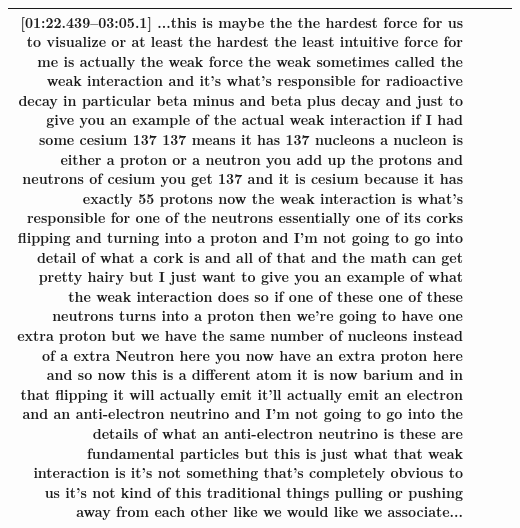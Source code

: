 \documentclass[10pt]{article}
\begin{document}
\begin{tiny}
\begin{longtable}{|r|p{0.375in}|p{1.275in}|p{3.5in}|}
                                                                                                                                                                                                                                                                                               \textbf{[01:22.439--03:05.1]} ...this is maybe the the hardest force for us to visualize or at least the hardest the least intuitive force for me is actually the weak force the weak sometimes called the weak interaction and it's what's responsible for radioactive decay in particular beta minus and beta plus decay and just to give you an example of the actual weak interaction if I had some cesium 137 137 means it has 137 nucleons a nucleon is either a proton or a neutron you add up the protons and neutrons of cesium you get 137 and it is cesium because it has exactly 55 protons now the weak interaction is what's responsible for one of the neutrons essentially one of its corks flipping and turning into a proton and I'm not going to go into detail of what a cork is and all of that and the math can get pretty hairy but I just want to give you an example of what the weak interaction does so if one of these one of these neutrons turns into a proton then we're going to have one extra proton but we have the same number of nucleons instead of a extra Neutron here you now have an extra proton here and so now this is a different atom it is now barium and in that flipping it will actually emit it'll actually emit an electron and an anti-electron neutrino and I'm not going to go into the details of what an anti-electron neutrino is these are fundamental particles but this is just what that weak interaction is it's not something that's completely obvious to us it's not kind of this traditional things pulling or pushing away from each other like we would like we associate... \\\hline

\end{longtable}
\end{tiny}
\end{document}

